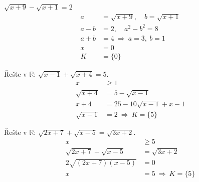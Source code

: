 \documentclass[11pt,a4paper]{article}
\begin{document}
\begin{zadaniReseniBox}[title={Samostatná práce 1}]
$\sqrt{x+9}-\sqrt{x+1}=2$
\tcblower
\[
\begin{aligned}
a&=\sqrt{x+9},\quad b=\sqrt{x+1}\\[2pt]
a-b&=2,\quad a^2-b^2=8\\[2pt]
a+b&=4\ \Rightarrow\ a=3,\ b=1\\[2pt]
x&=0\\[2pt]
K&=\{0\}
\end{aligned}
\]
\end{zadaniReseniBox}

\begin{zadaniReseniBox}[title={Rozšíření 1}]
Řešte v $\mathbb R$: $\sqrt{x-1}+\sqrt{x+4}=5$.
\tcblower
\[
\begin{aligned}x&\ge1\\\sqrt{x+4}&=5-\sqrt{x-1}\\x+4&=25-10\sqrt{x-1}+x-1\\\sqrt{x-1}&=2\ \Rightarrow\ K=\{5\}\end{aligned}
\]
\end{zadaniReseniBox}

\begin{zadaniReseniBox}[title={Rozšíření 2}]
Řešte v $\mathbb R$: $\sqrt{2x+7}+\sqrt{x-5}=\sqrt{3x+2}$.
\tcblower
\[
\begin{aligned}x&\ge5\\\sqrt{2x+7}+\sqrt{x-5}&=\sqrt{3x+2}\\2\sqrt{(2x+7)(x-5)}&=0\\x&=5\ \Rightarrow\ K=\{5\}\end{aligned}
\]
\end{zadaniReseniBox}
\end{document}
